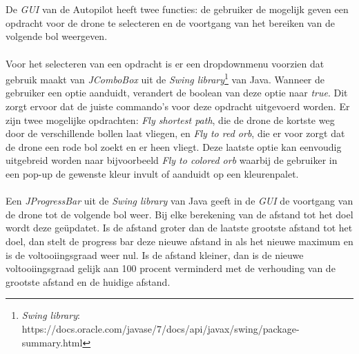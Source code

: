 \\
\\
De \textit{GUI} van de Autopilot heeft twee functies: de gebruiker de mogelijk geven een opdracht voor de drone te selecteren en de voortgang van het bereiken van de volgende bol weergeven.
\\
\\
Voor het selecteren van een opdracht is er een dropdownmenu voorzien dat gebruik maakt van \textit{JComboBox} uit de \textit{Swing library}\footnote{\textit{Swing library}: https://docs.oracle.com/javase/7/docs/api/javax/swing/package-summary.html} van Java. Wanneer de gebruiker een optie aanduidt, verandert de boolean van deze optie naar \textit{true}. Dit zorgt ervoor dat de juiste commando's voor deze opdracht uitgevoerd worden. Er zijn twee mogelijke opdrachten: \textit{Fly shortest path}, die de drone de kortste weg door de verschillende bollen laat vliegen, en \textit{Fly to red orb}, die er voor zorgt dat de drone een rode bol zoekt en er heen vliegt. Deze laatste optie kan eenvoudig uitgebreid worden naar bijvoorbeeld \textit{Fly to colored orb} waarbij de gebruiker in een pop-up de gewenste kleur invult of aanduidt op een kleurenpalet. 
\\
\\
Een \textit{JProgressBar} uit de \textit{Swing library} van Java geeft in de \textit{GUI} de voortgang van de drone tot de volgende bol weer. Bij elke berekening van de afstand tot het doel wordt deze ge\"{u}pdatet. Is de afstand groter dan de laatste grootste afstand tot het doel, dan stelt de progress bar deze nieuwe afstand in als het nieuwe maximum en is de voltooiingsgraad weer nul. Is de afstand kleiner, dan is de nieuwe voltooiingsgraad gelijk aan 100 procent verminderd met de verhouding van de grootste afstand en de huidige afstand.  
